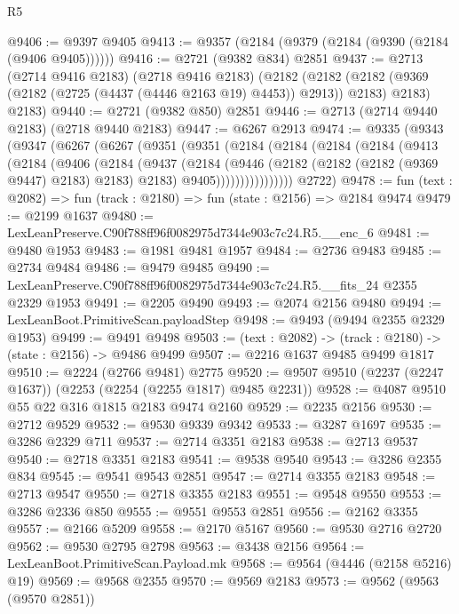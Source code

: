 \begin{lexlean}{R5}
\begin{coremodule}
@9406 := @9397 @9405
@9413 := @9357 (@2184 (@9379 (@2184 (@9390 (@2184 (@9406 @9405))))))
@9416 := @2721 (@9382 @834) @2851
@9437 := @2713
    (@2714 @9416 @2183)
    (@2718 @9416 @2183)
    (@2182
      (@2182 (@2182 (@9369 (@2182 (@2725 (@4437 (@4446 @2163 @19) @4453)) @2913)) @2183) @2183)
      @2183)
@9440 := @2721 (@9382 @850) @2851
@9446 := @2713 (@2714 @9440 @2183) (@2718 @9440 @2183)
@9447 := @6267 @2913
@9474 := @9335
    (@9343
      (@9347
        (@6267
          (@6267
            (@9351
              (@9351
                (@2184
                  (@2184
                    (@2184
                      (@2184
                        (@9413
                          (@2184
                            (@9406
                              (@2184
                                (@9437
                                  (@2184
                                    (@9446
                                      (@2182 (@2182 (@2182 (@9369 @9447) @2183) @2183) @2183)
                                      @9405))))))))))))))))
      @2722)
@9478 := fun (text : @2082) => fun (track : @2180) => fun (state : @2156) => @2184 @9474
@9479 := @2199 @1637
@9480 := LexLeanPreserve.C90f788ff96f0082975d7344e903c7c24.R5.__enc_6
@9481 := @9480 @1953
@9483 := @1981 @9481 @1957
@9484 := @2736 @9483
@9485 := @2734 @9484
@9486 := @9479 @9485
@9490 := LexLeanPreserve.C90f788ff96f0082975d7344e903c7c24.R5.__fits_24 @2355 @2329 @1953
@9491 := @2205 @9490
@9493 := @2074 @2156 @9480
@9494 := LexLeanBoot.PrimitiveScan.payloadStep
@9498 := @9493 (@9494 @2355 @2329 @1953)
@9499 := @9491 @9498
@9503 := (text : @2082) -> (track : @2180) -> (state : @2156) -> @9486 @9499
@9507 := @2216 @1637 @9485 @9499 @1817
@9510 := @2224 (@2766 @9481) @2775
@9520 := @9507 @9510 (@2237 (@2247 @1637)) (@2253 (@2254 (@2255 @1817) @9485 @2231))
@9528 := @4087 @9510 @55 @22 @316 @1815 @2183 @9474 @2160
@9529 := @2235 @2156
@9530 := @2712 @9529
@9532 := @9530 @9339 @9342
@9533 := @3287 @1697
@9535 := @3286 @2329 @711
@9537 := @2714 @3351 @2183
@9538 := @2713 @9537
@9540 := @2718 @3351 @2183
@9541 := @9538 @9540
@9543 := @3286 @2355 @834
@9545 := @9541 @9543 @2851
@9547 := @2714 @3355 @2183
@9548 := @2713 @9547
@9550 := @2718 @3355 @2183
@9551 := @9548 @9550
@9553 := @3286 @2336 @850
@9555 := @9551 @9553 @2851
@9556 := @2162 @3355
@9557 := @2166 @5209
@9558 := @2170 @5167
@9560 := @9530 @2716 @2720
@9562 := @9530 @2795 @2798
@9563 := @3438 @2156
@9564 := LexLeanBoot.PrimitiveScan.Payload.mk
@9568 := @9564 (@4446 (@2158 @5216) @19)
@9569 := @9568 @2355
@9570 := @9569 @2183
@9573 := @9562 (@9563 (@9570 @2851))

\end{coremodule}
\end{lexlean}
